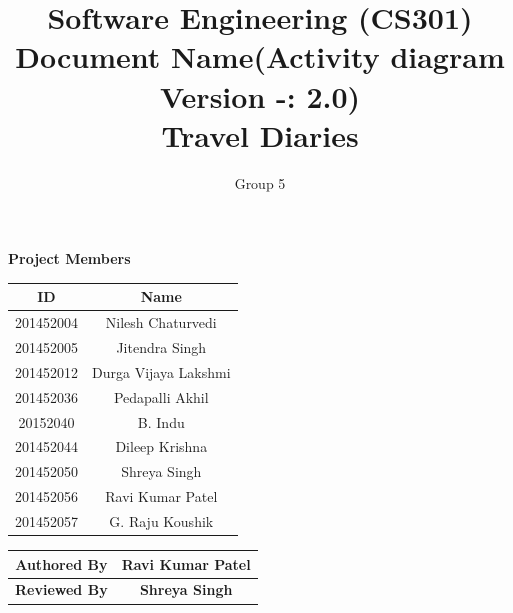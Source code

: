 \documentclass[]{article}
\title{Software Engineering (CS301)\\ Document Name(Activity diagram Version -: 2.0)\\Travel Diaries}
\author{Group 5}
\begin{document}
\maketitle


\begin{center}
\textbf{Project Members}\\
\vspace*{.6cm}
\begin{tabular}{|c|c|}
\hline
\textbf{ID} & \textbf{Name}\\
\hline
\hline
201452004 & Nilesh Chaturvedi\\
\hline
201452005 & Jitendra Singh\\
\hline
201452012 & Durga Vijaya Lakshmi\\
\hline
201452036 & Pedapalli Akhil\\
\hline
20152040 & B. Indu\\
\hline
201452044 & Dileep Krishna\\
\hline
201452050 & Shreya Singh\\
\hline
201452056 & Ravi Kumar Patel\\
\hline
201452057 & G. Raju Koushik\\
\hline
\end{tabular}

\vspace*{1cm}

\begin{tabular}{|c|c|}
\hline
\textbf{Authored By} & \textbf{Ravi Kumar Patel}\\
\hline
\textbf{Reviewed By} & \textbf{Shreya Singh}\\
\hline
\end{tabular}
\end{center}

\newpage
\tableofcontents
\newpage
\end{document}
